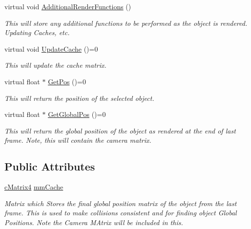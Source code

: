 \begin{DoxyCompactItemize}
virtual void \hyperlink{classv_render_object_a5e566d53432b096551f09c2866c6e0b0}{AdditionalRenderFunctions} ()
\begin{DoxyCompactList}\small\item\em This will store any additional functions to be performed as the object is rendered. Updating Caches, etc. \item\end{DoxyCompactList}\item 
virtual void \hyperlink{classv_render_object_a18c1f3fcab0c4c28358e539a5ec57ad3}{UpdateCache} ()=0
\begin{DoxyCompactList}\small\item\em This will update the cache matrix. \item\end{DoxyCompactList}\item 
virtual float $\ast$ \hyperlink{classv_render_object_aacd7e3aeb366f0f04f0f148ded8b89f4}{GetPos} ()=0
\begin{DoxyCompactList}\small\item\em This will return the position of the selected object. \item\end{DoxyCompactList}\item 
virtual float $\ast$ \hyperlink{classv_render_object_a514553ffc449f026b50fa47496311860}{GetGlobalPos} ()=0
\begin{DoxyCompactList}\small\item\em This will return the global position of the object as rendered at the end of last frame. Note, this will contain the camera matrix. \item\end{DoxyCompactList}\end{DoxyCompactItemize}
\subsection*{Public Attributes}
\begin{DoxyCompactItemize}
\item 
\hyperlink{classc_matrix4}{cMatrix4} \hyperlink{classv_render_object_a7ac4333806eaa793c4ce83e25764ad3b}{mmCache}
\begin{DoxyCompactList}\small\item\em Matrix which Stores the final global position matrix of the object from the last frame. This is used to make collisions consistent and for finding object Global Positions. Note the Camera MAtrix will be included in this. \item\end{DoxyCompactList}\end{DoxyCompactItemize}


